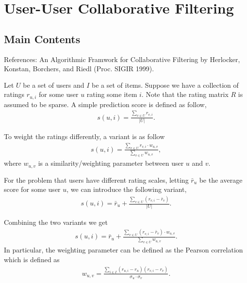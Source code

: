 \documentclass{article}
\theoremstyle{definition}
\begin{document}




\section{User-User Collaborative Filtering}

\subsection{Main Contents}
References: An Algorithmic Framwork for Collaborative Filtering by Herlocker, Konstan, Borchers, and Riedl (Proc. SIGIR 1999).

Let $U$ be a set of users and $I$ be a set of items. Suppose we have a collection of ratings $r_{u,i}$ for some user $u$ rating some item $i$. Note that the rating matrix $R$ is assumed to be sparse. A simple prediction score is defined as follow,
\begin{align}
    s(u,i) = \frac{\sum_{v \in U} r_{v, i} }{|U|}.
\end{align}

To weight the ratings differently, a variant is as follow
\begin{align}
    s(u,i) = \frac{\sum_{v \in U} r_{v, i} \cdot w_{u,v} }{\sum_{v\in U} w_{u, v}},
\end{align}
where $w_{u,v}$ is a similarity/weighting parameter between user $u$ and $v$. 

For the problem that users have different rating scales, letting $\bar{r}_u$ be the average score for some user $u$, we can introduce the following variant,
\begin{align}
    s(u,i) = \bar{r}_{u} + \frac{\sum_{v\in U} (r_{v, i} - \bar{r}_v)}{|U|}.
\end{align}

Combining the two variants we get 
\begin{align}
    s(u,i) = \bar{r}_{u} + \frac{\sum_{v\in U} (r_{v, i} - \bar{r}_v) \cdot w_{u, v}}{\sum_{v\in U} w_{u, v}}.
\end{align}
In particular, the weighting parameter can be defined as the Pearson correlation which is defined as 
\begin{align*}
    w_{u,v} = \frac{\sum_{i \in I} (r_{u,i} - r_u)(r_{v,i} - r_v)}{\sigma_u \cdot \sigma_v}.
\end{align*}
\end{document}
